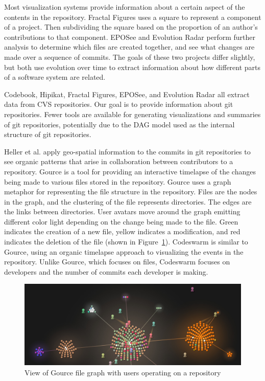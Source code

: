 Most visualization systems provide information about a certain aspect of
the contents in the repository. Fractal Figures\cite{Ambros2005} uses a
square to represent a component of a project. Then subdividing the
square based on the proportion of an author's contributions to that
component. EPOSee\cite{Burch2005} and Evolution Radar\cite{Ambros2009}
perform further analysis to determine which files are created together,
and see what changes are made over a sequence of commits. The goals of
these two projects differ slightly, but both use evolution over time to
extract information about how different parts of a software system are
related.

Codebook, Hipikat, Fractal Figures, EPOSee, and Evolution Radar all
extract data from CVS repositories. Our goal is to provide information
about git repositories. Fewer tools are available for generating
visualizations and summaries of git repositories, potentially due to the
DAG model used as the internal structure of git repositories.

Heller et al.\cite{Heller2011} apply geo-spatial information to the
commits in git repositories to see organic patterns that arise in
collaboration between contributors to a repository.
Gource\cite{Caudwell2010} is a tool for providing an interactive
timelapse of the changes being made to various files stored in the
repository. Gource uses a graph metaphor for representing the file
structure in the repository. Files are the nodes in the graph, and the
clustering of the file represents directories. The edges are the links
between directories. User avatars move around the graph emitting
different color light depending on the change being made to the file.
Green indicates the creation of a new file, yellow indicates a
modification, and red indicates the deletion of the file (shown in
Figure~\ref{fig:gource_view}). Codeswarm\cite{ogawa09} is similar to
Gource, using an organic timelapse approach to visualizing the events in
the repository. Unlike Gource, which focuses on files, Codeswarm focuses
on developers and the number of commits each developer is making.

\begin{figure}[htpb]
  \centering
  \includegraphics[width=0.8\linewidth]{./Figures/introduction/gource-linux.jpg}
  \caption{View of Gource file graph with users operating on a
    repository}
  \label{fig:gource_view}
\end{figure}

